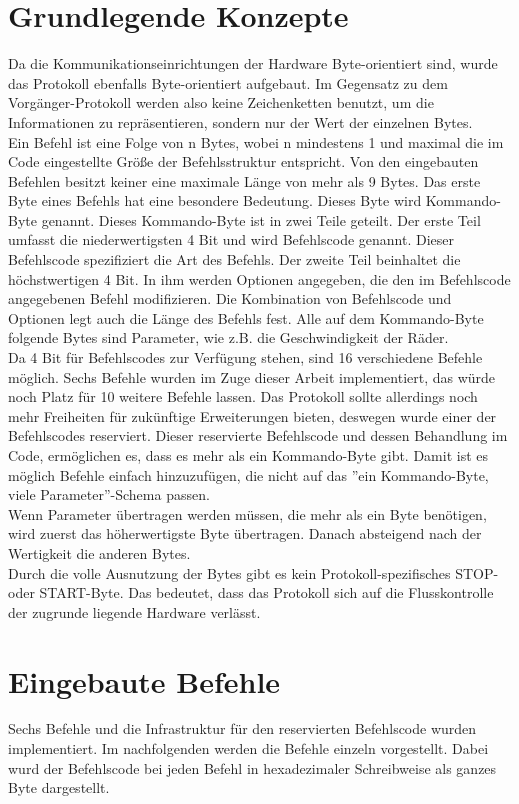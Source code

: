 \section{Grundlegende Konzepte}
Da die Kommunikationseinrichtungen der Hardware Byte-orientiert sind, wurde das
Protokoll ebenfalls Byte-orientiert aufgebaut. Im Gegensatz zu dem Vorgänger-Protokoll
werden also keine Zeichenketten benutzt, um die Informationen zu repräsentieren, sondern
nur der Wert der einzelnen Bytes.\\
Ein Befehl ist eine Folge von n Bytes, wobei n mindestens 1 und maximal die im Code
eingestellte Größe der Befehlsstruktur entspricht. Von den eingebauten Befehlen besitzt
keiner eine maximale Länge von mehr als 9 Bytes. Das erste Byte eines Befehls hat eine
besondere Bedeutung. Dieses Byte wird Kommando-Byte genannt. Dieses Kommando-Byte
ist in zwei Teile geteilt. Der erste Teil umfasst die niederwertigsten 4 Bit und
wird Befehlscode genannt. Dieser Befehlscode spezifiziert die Art des Befehls.
Der zweite Teil beinhaltet die höchstwertigen 4 Bit. In ihm werden Optionen
angegeben, die den im Befehlscode angegebenen Befehl modifizieren. Die Kombination
von Befehlscode und Optionen legt auch die Länge des Befehls fest. Alle auf dem
Kommando-Byte folgende Bytes sind Parameter, wie z.B. die Geschwindigkeit der Räder.\\
Da 4 Bit für Befehlscodes zur Verfügung stehen, sind 16 verschiedene Befehle möglich.
Sechs Befehle wurden im Zuge dieser Arbeit implementiert, das würde noch Platz für
10 weitere Befehle lassen. Das Protokoll sollte allerdings noch mehr Freiheiten
für zukünftige Erweiterungen bieten, deswegen wurde einer der Befehlscodes
reserviert. Dieser reservierte Befehlscode und dessen Behandlung im Code, ermöglichen
es, dass es mehr als ein Kommando-Byte gibt. Damit ist es möglich Befehle einfach 
hinzuzufügen, die nicht auf das ''ein Kommando-Byte, viele Parameter''-Schema passen.\\
Wenn Parameter übertragen werden müssen, die mehr als ein Byte benötigen, wird zuerst
das höherwertigste Byte übertragen. Danach absteigend nach der Wertigkeit die anderen
Bytes.\\
Durch die volle Ausnutzung der Bytes gibt es kein Protokoll-spezifisches STOP- oder START-Byte.
Das bedeutet, dass das Protokoll sich auf die Flusskontrolle der zugrunde liegende Hardware
verlässt.

\section{Eingebaute Befehle}
Sechs Befehle und die Infrastruktur für den reservierten Befehlscode wurden implementiert.
Im nachfolgenden werden die Befehle einzeln vorgestellt. Dabei wurd der Befehlscode bei
jeden Befehl in hexadezimaler Schreibweise als ganzes Byte dargestellt.

